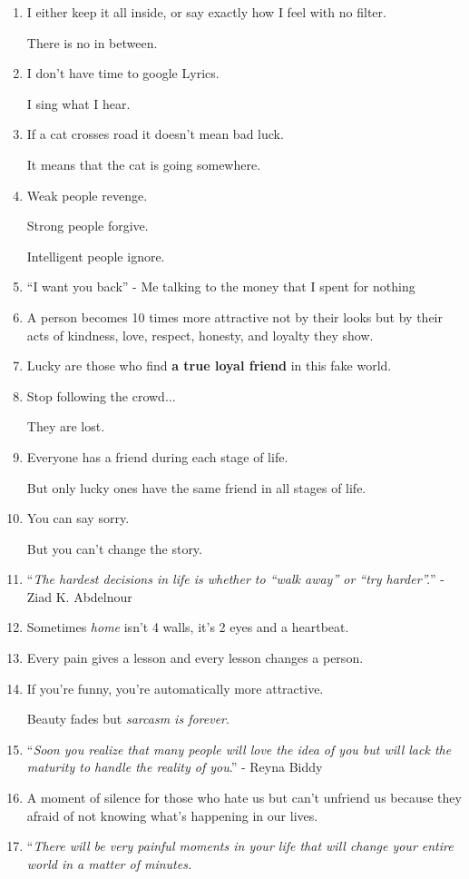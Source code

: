 \documentclass{article}
\numberwithin{equation}{section}
\begin{document}
\begin{enumerate}
    Every day.
    
    To everyone.
    
    The difference is in how people deal with it.
    \item I either keep it all inside, or say exactly how I feel with no filter.
    
    There is no in between.
    \item I don't have time to google Lyrics.
    
    I sing what I hear.
    \item If a cat crosses road it doesn't mean bad luck.
    
    It means that the cat is going somewhere.
    \item Weak people revenge.
    
    Strong people forgive.
    
    Intelligent people ignore.
    \item ``I want you back'' - Me talking to the money that I spent for nothing
    \item A person becomes 10 times more attractive not by their looks but by their acts of kindness, love, respect, honesty, and loyalty they show.
    \item Lucky are those who find \textbf{a true loyal friend} in this fake world.
    \item Stop following the crowd$\ldots$
    
    They are lost.
    \item Everyone has a friend during each stage of life.
    
    But only lucky ones have the same friend in all stages of life.
    \item You can say sorry.
    
    But you can't change the story.
    \item ``\textit{The hardest decisions in life is whether to ``walk away'' or ``try harder''.}'' - Ziad K. Abdelnour
    \item Sometimes \textit{home} isn't 4 walls, it's 2 eyes and a heartbeat.
    \item Every pain gives a lesson and every lesson changes a person.
    \item If you're funny, you're automatically more attractive.
    
    Beauty fades but \textit{sarcasm is forever}.
    \item ``\textit{Soon you realize that many people will love the idea of you but will lack the maturity to handle the reality of you}.'' - Reyna Biddy
    \item A moment of silence for those who hate us but can't unfriend us because they afraid of not knowing what's happening in our lives.
    \item ``\textit{There will be very painful moments in your life that will change your entire world in a matter of minutes.}
    

\end{enumerate}
\end{document}
